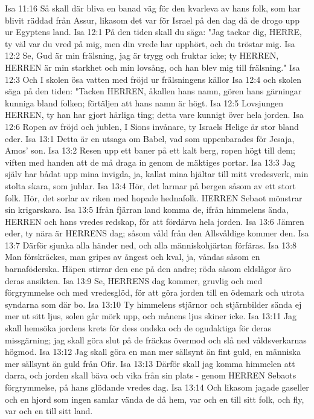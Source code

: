 Isa 11:16  Så skall där bliva en banad väg för den kvarleva av hans folk, som har blivit räddad från Assur, likasom det var för Israel på den dag då de drogo upp ur Egyptens land.
Isa 12:1  På den tiden skall du säga: "Jag tackar dig, HERRE, ty väl var du vred på mig, men din vrede har upphört, och du tröstar mig.
Isa 12:2  Se, Gud är min frälsning, jag är trygg och fruktar icke; ty HERREN, HERREN är min starkhet och min lovsång, och han blev mig till frälsning."
Isa 12:3  Och I skolen ösa vatten med fröjd ur frälsningens källor
Isa 12:4  och skolen säga på den tiden: "Tacken HERREN, åkallen hans namn, gören hans gärningar kunniga bland folken; förtäljen att hans namn är högt.
Isa 12:5  Lovsjungen HERREN, ty han har gjort härliga ting; detta vare kunnigt över hela jorden.
Isa 12:6  Ropen av fröjd och jublen, I Sions invånare, ty Israels Helige är stor bland eder.
Isa 13:1  Detta är en utsaga om Babel, vad som uppenbarades för Jesaja, Amos' son.
Isa 13:2  Resen upp ett baner på ett kalt berg, ropen högt till dem; viften med handen att de må draga in genom de mäktiges portar.
Isa 13:3  Jag själv har bådat upp mina invigda, ja, kallat mina hjältar till mitt vredesverk, min stolta skara, som jublar.
Isa 13:4  Hör, det larmar på bergen såsom av ett stort folk. Hör, det sorlar av riken med hopade hednafolk. HERREN Sebaot mönstrar sin krigarskara.
Isa 13:5  Ifrån fjärran land komma de, ifrån himmelens ända, HERREN och hans vredes redskap, för att fördärva hela jorden.
Isa 13:6  Jämren eder, ty nära är HERRENS dag; såsom våld från den Allsvåldige kommer den.
Isa 13:7  Därför sjunka alla händer ned, och alla människohjärtan förfäras.
Isa 13:8  Man förskräckes, man gripes av ångest och kval, ja, våndas såsom en barnaföderska. Häpen stirrar den ene på den andre; röda såsom eldslågor äro deras ansikten.
Isa 13:9  Se, HERRENS dag kommer, gruvlig och med förgrymmelse och med vredesglöd, för att göra jorden till en ödemark och utrota syndarna som där bo.
Isa 13:10  Ty himmelens stjärnor och stjärnbilder sända ej mer ut sitt ljus, solen går mörk upp, och månens ljus skiner icke.
Isa 13:11  Jag skall hemsöka jordens krets för dess ondska och de ogudaktiga för deras missgärning; jag skall göra slut på de fräckas övermod och slå ned våldsverkarnas högmod.
Isa 13:12  Jag skall göra en man mer sällsynt än fint guld, en människa mer sällsynt än guld från Ofir.
Isa 13:13  Därför skall jag komma himmelen att darra, och jorden skall bäva och vika från sin plats - genom HERREN Sebaots förgrymmelse, på hans glödande vredes dag.
Isa 13:14  Och likasom jagade gaseller och en hjord som ingen samlar vända de då hem, var och en till sitt folk, och fly, var och en till sitt land.
